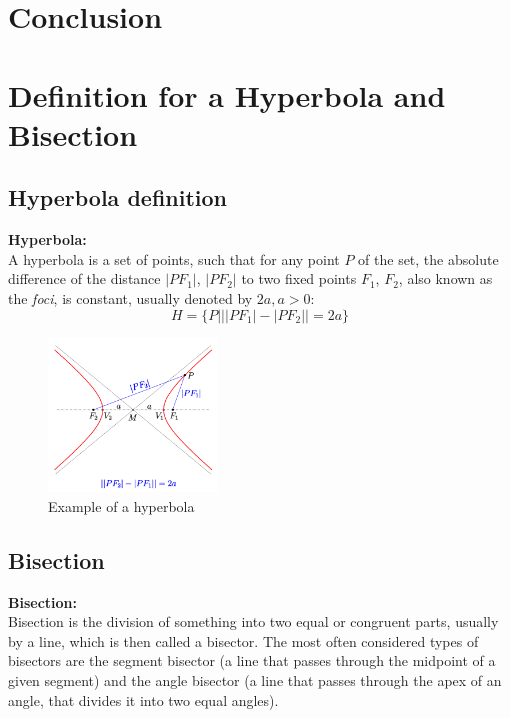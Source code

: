 \chapter{Conclusion}



\newpage

\appendix

\chapter{Definition for a Hyperbola and Bisection}
\label{appendix:def}
\section{Hyperbola definition} 

\begin{mydef}
	\textbf{Hyperbola:} \\ 
	A hyperbola\cite{Hyperbola} is a set of
	points, such that for any point $P$ of the set, the absolute difference of
	the distance $|PF_1|$, $|PF_2|$ to two fixed points $F_1$, $F_2$, also known
	as the \textit{foci}, is constant, usually denoted by $2a, a>0$:
	$$H=\{P|||PF_1|-|PF_2||=2a\}$$ 
\end{mydef}

\begin{figure}[H] 
	\centering
	\includegraphics[width=0.4\textwidth]{figures/hyperbel-def-e.png} 
	\caption{Example of a hyperbola} 
	\label{fig:hyperbola} 
\end{figure}

\section{Bisection}

\begin{mydef}
	\textbf{Bisection:} \\ 
	Bisection is the division of something into
	two equal or congruent parts, usually by a line, which is then called a
	bisector. The most often considered types of bisectors are the segment
	bisector (a line that passes through the midpoint of a given segment) and
	the angle bisector (a line that passes through the apex of an angle, that
	divides it into two equal angles).\cite{Bisector-collinearity-convexPoly}
\end{mydef}

